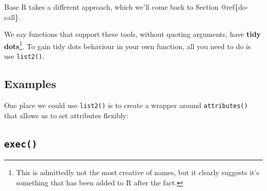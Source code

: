 \documentclass[]{book}
\newenvironment{Shaded}{\begin{snugshade}}{\end{snugshade}}
\newcommand{\CommentTok}[1]{\textcolor[rgb]{0.37,0.37,0.37}{\textit{#1}}}
\newcommand{\ControlFlowTok}[1]{\textcolor[rgb]{0.27,0.27,0.27}{\textbf{#1}}}
\newcommand{\DataTypeTok}[1]{\textcolor[rgb]{0.27,0.27,0.27}{#1}}
\newcommand{\DecValTok}[1]{\textcolor[rgb]{0.06,0.06,0.06}{#1}}
\newcommand{\ErrorTok}[1]{\textcolor[rgb]{0.14,0.14,0.14}{\textbf{#1}}}
\newcommand{\KeywordTok}[1]{\textcolor[rgb]{0.27,0.27,0.27}{\textbf{#1}}}
\newcommand{\NormalTok}[1]{#1}
\newcommand{\OperatorTok}[1]{\textcolor[rgb]{0.43,0.43,0.43}{\textbf{#1}}}
\newcommand{\StringTok}[1]{\textcolor[rgb]{0.5,0.5,0.5}{#1}}
\let\rmarkdownfootnote\footnote%
\def\footnote{\protect\rmarkdownfootnote}
\begin{document}
Base R takes a different approach, which we'll come back to Section @ref\{do-call\}.

We say functions that support these tools, without quoting arguments, have \textbf{tidy dots}\footnote{This is admittedly not the most creative of names, but it clearly suggests it's something that has been added to R after the fact.}. To gain tidy dots behaviour in your own function, all you need to do is use \texttt{list2()}.

\hypertarget{examples}{%
\subsection{Examples}\label{examples}}


One place we could use \texttt{list2()} is to create a wrapper around \texttt{attributes()} that allows us to set attributes flexibly:

\begin{Shaded}
\end{Shaded}

\hypertarget{exec}{%
\subsection{\texorpdfstring{\texttt{exec()}}{exec()}}\label{exec}}
\end{document}
